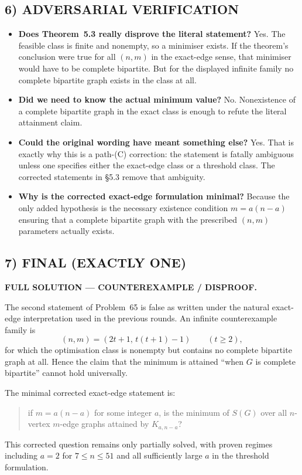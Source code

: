 \subsection*{6) ADVERSARIAL VERIFICATION}

\begin{itemize}
\item \textbf{Does Theorem~5.3 really disprove the literal statement?}
Yes. The feasible class is finite and nonempty, so a minimiser exists. If the theorem's conclusion were true for all $(n,m)$ in the exact-edge sense, that minimiser would have to be complete bipartite. But for the displayed infinite family no complete bipartite graph exists in the class at all.

\item \textbf{Did we need to know the actual minimum value?}
No. Nonexistence of a complete bipartite graph in the exact class is enough to refute the literal attainment claim.

\item \textbf{Could the original wording have meant something else?}
Yes. That is exactly why this is a path-(C) correction: the statement is fatally ambiguous unless one specifies either the exact-edge class or a threshold class. The corrected statements in \S5.3 remove that ambiguity.

\item \textbf{Why is the corrected exact-edge formulation minimal?}
Because the only added hypothesis is the necessary existence condition $m=a(n-a)$ ensuring that a complete bipartite graph with the prescribed $(n,m)$ parameters actually exists.
\end{itemize}

\subsection*{7) FINAL (EXACTLY ONE)}

\textbf{FULL SOLUTION --- COUNTEREXAMPLE / DISPROOF.}

The second statement of Problem~65 is false as written under the natural exact-edge interpretation used in the previous rounds.
An infinite counterexample family is
\[
(n,m)=(2t+1,\,t(t+1)-1)\qquad(t\ge 2),
\]
for which the optimisation class is nonempty but contains no complete bipartite graph at all.
Hence the claim that the minimum is attained ``when $G$ is complete bipartite'' cannot hold universally.

The minimal corrected exact-edge statement is:
\begin{quote}
if $m=a(n-a)$ for some integer $a$, is the minimum of $S(G)$ over all $n$-vertex $m$-edge graphs attained by $K_{a,n-a}$?
\end{quote}
This corrected question remains only partially solved, with proven regimes including $a=2$ for $7\le n\le 51$ and all sufficiently large $a$ in the threshold formulation.

